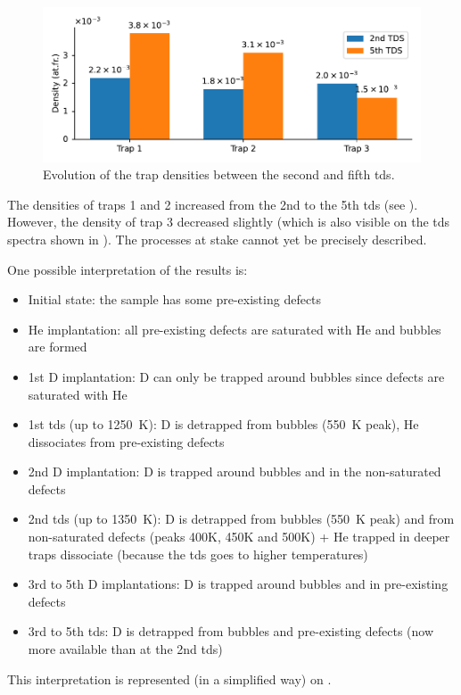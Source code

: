 \begin{figure}
    \centering
    \includegraphics[width=\linewidth]{Figures/Chapter5/trap_densities.pdf}
    \caption{Evolution of the trap densities between the second and fifth \gls{tds}.}
\end{figure}

The densities of traps 1 and 2 increased from the 2nd to the 5th \gls{tds} (see ).
However, the density of trap 3 decreased slightly (which is also visible on the \gls{tds} spectra shown in ).
The processes at stake cannot yet be precisely described. 

One possible interpretation of the results is:
\begin{itemize}
    \item Initial state: the sample has some pre-existing defects %
    \item \gls{He} implantation: all pre-existing defects are saturated with \gls{He} and bubbles are formed
    \item 1st \gls{D} implantation: \gls{D} can only be trapped around bubbles since defects are saturated with \gls{He}
    \item 1st \gls{tds} (up to \SI{1250}{K}): \gls{D} is detrapped from bubbles (\SI{550}{K} peak), \gls{He} dissociates from pre-existing defects 
    \item 2nd \gls{D} implantation: \gls{D} is trapped around bubbles and in the non-saturated defects
    \item 2nd \gls{tds} (up to \SI{1350}{K}): \gls{D} is detrapped from bubbles (\SI{550}{K} peak) and from non-saturated defects (peaks 400K, 450K and 500K) + \gls{He} trapped in deeper traps dissociate (because the \gls{tds} goes to higher temperatures)
    \item 3rd to 5th \gls{D} implantations: \gls{D} is trapped around bubbles and in pre-existing defects
    \item 3rd to 5th \gls{tds}: \gls{D} is detrapped from bubbles and pre-existing defects (now more available than at the 2nd \gls{tds})
\end{itemize}
This interpretation is represented (in a simplified way) on .


